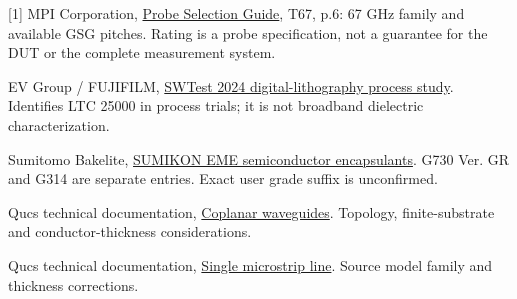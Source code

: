 \documentclass[10pt,letterpaper]{article}
\newcommand{\subhead}[1]{\par\addvspace{7pt}\noindent{\large\bfseries\color{teal}#1}\par\nobreak\vspace{2pt}}
\begin{document}
\subhead{Sources}
{\small
[1] MPI Corporation, \href{https://www.mpi-corporation.com/wp-content/uploads/ASTPDF/MPI-Probe-Selection-Guide.pdf}{Probe Selection Guide}, T67, p.6: 67 GHz family and available GSG pitches. Rating is a probe specification, not a guarantee for the DUT or the complete measurement system.\par
[2] EV Group / FUJIFILM, \href{https://www.swtest.org/swtw_library/2024proc/pdf/W06_03_VARGA_SWTest-2024.pdf}{SWTest 2024 digital-lithography process study}. Identifies LTC 25000 in process trials; it is not broadband dielectric characterization.\par
[3] Sumitomo Bakelite, \href{https://www.sumibe.co.jp/product/it-materials/epoxy/sumikon-eme/}{SUMIKON EME semiconductor encapsulants}. G730 Ver. GR and G314 are separate entries. Exact user grade suffix is unconfirmed.\par
[4] Qucs technical documentation, \href{https://qucs.github.io/tech/node86.html}{Coplanar waveguides}. Topology, finite-substrate and conductor-thickness considerations.\par
[5] Qucs technical documentation, \href{https://qucs.github.io/tech/node75.html}{Single microstrip line}. Source model family and thickness corrections.\par
}
\end{document}
